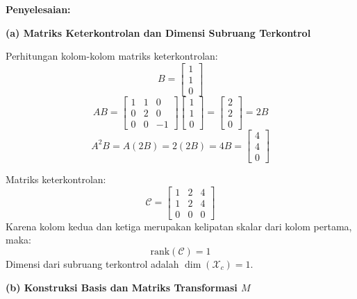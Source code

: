 \documentclass[11pt,a4paper]{article}
\begin{document}
\textbf{Penyelesaian:}

\textbf{(a) Matriks Keterkontrolan dan Dimensi Subruang Terkontrol}

Perhitungan kolom-kolom matriks keterkontrolan:
$$B = \begin{bmatrix} 1 \\ 1 \\ 0 \end{bmatrix}$$
$$AB = \begin{bmatrix} 1 & 1 & 0 \\ 0 & 2 & 0 \\ 0 & 0 & -1 \end{bmatrix} \begin{bmatrix} 1 \\ 1 \\ 0 \end{bmatrix} = \begin{bmatrix} 2 \\ 2 \\ 0 \end{bmatrix} = 2B$$
$$A^2 B = A(2B) = 2(2B) = 4B = \begin{bmatrix} 4 \\ 4 \\ 0 \end{bmatrix}$$

Matriks keterkontrolan:
$$\mathcal{C} = \begin{bmatrix} 1 & 2 & 4 \\ 1 & 2 & 4 \\ 0 & 0 & 0 \end{bmatrix}$$
Karena kolom kedua dan ketiga merupakan kelipatan skalar dari kolom pertama, maka:
$$\text{rank}(\mathcal{C}) = 1$$
Dimensi dari subruang terkontrol adalah $\dim(\mathcal{X}_c) = 1$.

\textbf{(b) Konstruksi Basis dan Matriks Transformasi $M$}
\end{document}
